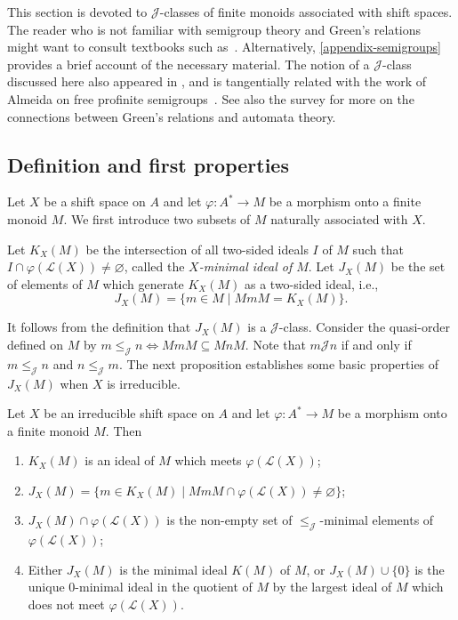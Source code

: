 \documentclass[a4paper,UKenglish,numberwithinsect,cleveref]{lipics-v2021}
\newcommand{\JJ}{\mathrel{\mathscr{J}}}
\newcommand{\cL}{\mathcal L}
\begin{document}
This section is devoted to $\JJ$-classes of finite monoids associated with shift spaces. The reader who is not familiar with semigroup theory and Green's relations might want to consult textbooks such as~\cite{BerstelPerrinReutenauer2009,book/Lallement1979,book/Grillet1995,book/Howie1995,Eilenberg1974,Eilenberg1976}.
Alternatively, \cref{appendix-semigroups} provides a brief account of the necessary material.
The notion of a $\JJ$-class discussed here also appeared in \cite{Perrin2015,PerrinSchupp1986}, and is tangentially related with the work of Almeida on free profinite semigroups~\cite{Almeida2005}. See also the survey \cite{Colcombet2011} for more on the connections between Green's relations and automata theory.

\subsection{Definition and first properties}

Let $X$ be a shift space on $A$ and let $\varphi\colon A^*\to M$ be a morphism onto a finite monoid $M$. We first introduce two subsets of $M$ naturally associated with $X$. 

\begin{definition}
    Let $K_X(M)$ be the intersection of all two-sided ideals $I$ of $M$ such that $I\cap\varphi(\cL(X))\neq\varnothing$, called the \emph{$X$-minimal ideal of $M$}. Let $J_X(M)$ be the set of elements of $M$ which generate $K_X(M)$ as a two-sided ideal, i.e., 
    \begin{equation*}
        J_X(M) = \{ m\in M \mid MmM = K_X(M)\}.
    \end{equation*}
\end{definition}

It follows from the definition that $J_X(M)$ is a $\JJ$-class. Consider the quasi-order defined on $M$ by $m\leq_{\JJ} n\iff MmM\subseteq MnM$. Note that $m\JJ n$ if and only if $m\leq_{\JJ} n$ and $n\leq_{\JJ} m$. The next proposition establishes some basic properties of $J_X(M)$ when $X$ is irreducible.

\begin{proposition}\label{prop:Jclass}
    Let $X$ be an irreducible shift space on $A$ and let $\varphi\colon A^*\to M$ be a morphism onto a finite monoid $M$. Then 
    \begin{enumerate}
        \item $K_X(M)$ is an ideal  of $M$ which meets $\varphi(\cL(X))$;
            \label{Jclass-ideal}
        \item $J_X(M)=\{m\in K_X(M)\mid MmM\cap\varphi(\cL(X))\ne\varnothing\}$;
            \label{Jclass-intersect}
        \item $J_X(M)\cap\varphi(\cL(X))$ is the non-empty set of $\leq_{\JJ}$-minimal elements of $\varphi(\cL(X))$;
            \label{Jclass-J-minimal}
        \item Either $J_X(M)$ is the minimal ideal $K(M)$ of $M$, or $J_X(M)\cup\{0\}$ is the unique 0-minimal ideal in the quotient of $M$ by the largest ideal of $M$ which does not meet $\varphi(\cL(X))$. 
            \label{Jclass-min-ideal}
    \end{enumerate}
\end{proposition}
\end{document}
